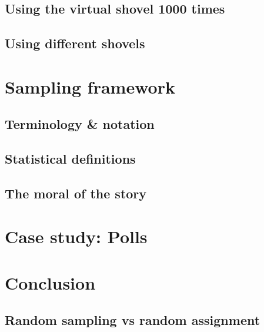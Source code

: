 \documentclass[12pt, krantz2,]{krantz}
\begin{document}
\hypertarget{shovel-1000-times}{%
\subsection{Using the virtual shovel 1000 times}\label{shovel-1000-times}}

\hypertarget{different-shovels}{%
\subsection{Using different shovels}\label{different-shovels}}

\hypertarget{sampling-framework}{%
\section{Sampling framework}\label{sampling-framework}}

\hypertarget{terminology-and-notation}{%
\subsection{Terminology \& notation}\label{terminology-and-notation}}

\hypertarget{statistical-definitions}{%
\subsection{Statistical definitions}\label{statistical-definitions}}

\hypertarget{the-moral-of-the-story}{%
\subsection{The moral of the story}\label{the-moral-of-the-story}}

\hypertarget{sampling-case-study}{%
\section{Case study: Polls}\label{sampling-case-study}}

\hypertarget{sampling-conclusion}{%
\section{Conclusion}\label{sampling-conclusion}}

\hypertarget{sampling-conclusion-sampling-vs-assignment}{%
\subsection{Random sampling vs random assignment}\label{sampling-conclusion-sampling-vs-assignment}}
\end{document}
